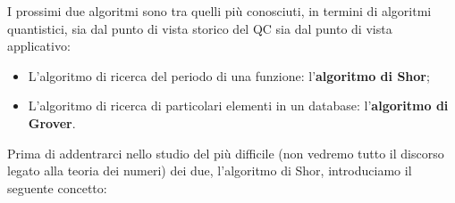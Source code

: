 \vspace{1cm}

\noindent{}
\vspace{0.5cm}
\noindent I prossimi due algoritmi sono tra quelli più conosciuti, in termini di algoritmi quantistici, sia dal punto di vista storico del QC sia dal punto di vista applicativo:
\begin{itemize}
    \item L'algoritmo di ricerca del periodo di una funzione: l'\textbf{algoritmo di Shor};
    \item L'algoritmo di ricerca di particolari elementi in un database: l'\textbf{algoritmo di Grover}.
\end{itemize}
Prima di addentrarci nello studio del più difficile (non vedremo tutto il discorso legato alla teoria dei numeri) dei due, l'algoritmo di Shor, introduciamo il seguente concetto:


